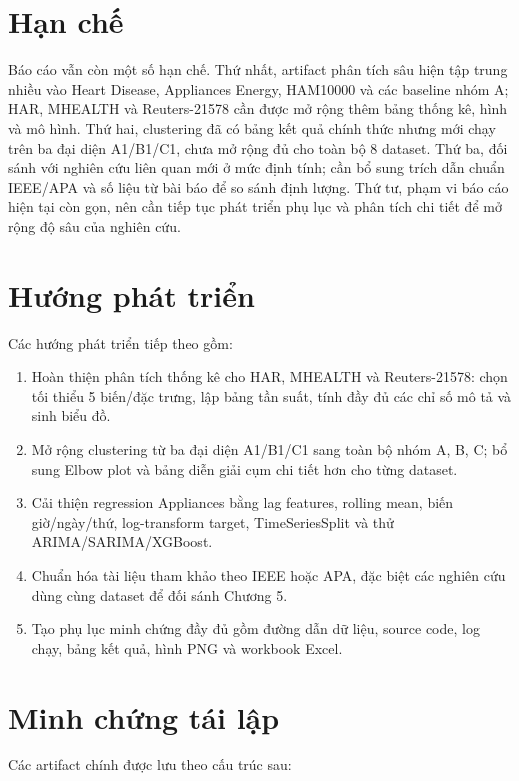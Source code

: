 \section{Hạn chế}

Báo cáo vẫn còn một số hạn chế. Thứ nhất, artifact phân tích sâu hiện tập trung nhiều vào Heart Disease, Appliances Energy, HAM10000 và các baseline nhóm A; HAR, MHEALTH và Reuters-21578 cần được mở rộng thêm bảng thống kê, hình và mô hình. Thứ hai, clustering đã có bảng kết quả chính thức nhưng mới chạy trên ba đại diện A1/B1/C1, chưa mở rộng đủ cho toàn bộ 8 dataset. Thứ ba, đối sánh với nghiên cứu liên quan mới ở mức định tính; cần bổ sung trích dẫn chuẩn IEEE/APA và số liệu từ bài báo để so sánh định lượng. Thứ tư, phạm vi báo cáo hiện tại còn gọn, nên cần tiếp tục phát triển phụ lục và phân tích chi tiết để mở rộng độ sâu của nghiên cứu.

\section{Hướng phát triển}

Các hướng phát triển tiếp theo gồm:

\begin{enumerate}
    \item Hoàn thiện phân tích thống kê cho HAR, MHEALTH và Reuters-21578: chọn tối thiểu 5 biến/đặc trưng, lập bảng tần suất, tính đầy đủ các chỉ số mô tả và sinh biểu đồ.
    \item Mở rộng clustering từ ba đại diện A1/B1/C1 sang toàn bộ nhóm A, B, C; bổ sung Elbow plot và bảng diễn giải cụm chi tiết hơn cho từng dataset.
    \item Cải thiện regression Appliances bằng lag features, rolling mean, biến giờ/ngày/thứ, log-transform target, TimeSeriesSplit và thử ARIMA/SARIMA/XGBoost.
    \item Chuẩn hóa tài liệu tham khảo theo IEEE hoặc APA, đặc biệt các nghiên cứu dùng cùng dataset để đối sánh Chương 5.
    \item Tạo phụ lục minh chứng đầy đủ gồm đường dẫn dữ liệu, source code, log chạy, bảng kết quả, hình PNG và workbook Excel.
\end{enumerate}

\section{Minh chứng tái lập}

Các artifact chính được lưu theo cấu trúc sau:

